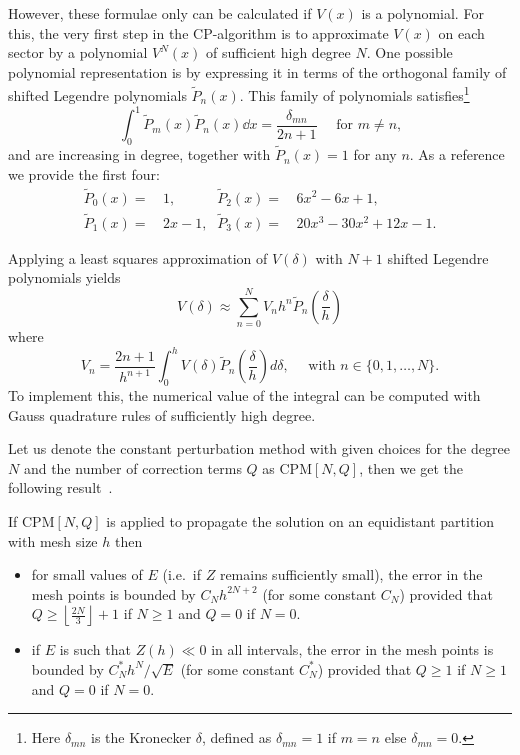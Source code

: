 However, these formulae only can be calculated if $V(x)$ is a polynomial. For this, the very first step in the CP-algorithm is to approximate $V(x)$ on each sector by a polynomial $V^{N}(x)$ of sufficient high degree $N$. One possible polynomial representation is by expressing it in terms of the orthogonal family of shifted Legendre polynomials $\widetilde{P}_n(x)$. This family of polynomials satisfies\footnote{Here $\delta_{mn}$ is the Kronecker $\delta$, defined as $\delta_{mn} = 1$ if $m=n$ else $\delta_{mn} = 0$.}
$$
    \int_0^1 \widetilde{P}_m(x) \widetilde{P}_n(x) \dd x = \frac{\delta_{mn}}{2n + 1} \quad\text{ for $m \neq n$,}
$$
and are increasing in degree, together with $\widetilde{P}_n(x) = 1$ for any $n$. As a reference we provide the first four:
\begin{align*}
    \widetilde{P}_0(x) = & \,1\text{,}      & \widetilde{P}_2(x) = & \,6x^2 - 6x + 1\text{,}             \\
    \widetilde{P}_1(x) = & \,2x - 1\text{,} & \widetilde{P}_3(x) = & \,20 x^3 - 30 x^2 +12 x - 1\text{.}
\end{align*}

Applying a least squares approximation of $V(\delta)$ with $N + 1$ shifted Legendre polynomials yields
$$
    V(\delta) \approx \sum_{n=0}^N V_n h^n \widetilde{P}_n\left(\frac{\delta}{h}\right)
$$
where
\begin{equation}\label{equ:c2_legendre_V}
    V_n= \frac{2 n + 1}{h^{n+1}} \int_0^h V(\delta) \widetilde{P}_n\left(\frac{\delta}{h}\right) d \delta, \quad \text{ with $n \in \{0, 1,\dots, N\}$.}
\end{equation}
To implement this, the numerical value of the integral can be computed with Gauss quadrature rules of sufficiently high degree.

Let us denote the constant perturbation method with given choices for the degree $N$ and the number of correction terms $Q$ as CPM$[N,Q]$, then we get the following result~\cite{ixaru_cp_1998}.

\begin{theorem}\label{the:c2_h_error_estimate}
    If $\text{CPM}[N,Q]$ is applied to propagate the solution on an equidistant partition with mesh size $h$ then
    \begin{itemize}
        \item for small values of $E$ (i.e.\ if $Z$ remains sufficiently small), the error in the mesh points is bounded by $C_N h^{2N+2}$ (for some constant $C_N$) provided that $Q \geq \left\lfloor \frac{2N}{3} \right\rfloor +1$ if $N \geq 1$ and $Q=0$ if $N=0$.
        \item if $E$ is such that $Z(h)\ll 0$ in all intervals, the error in the mesh points is bounded by $C^*_N h^{N}/ \sqrt{E}$  (for some constant $C^*_N$) provided that $Q \geq 1$  if $N \geq 1$ and $Q=0$ if $N=0$.
    \end{itemize}
\end{theorem}


